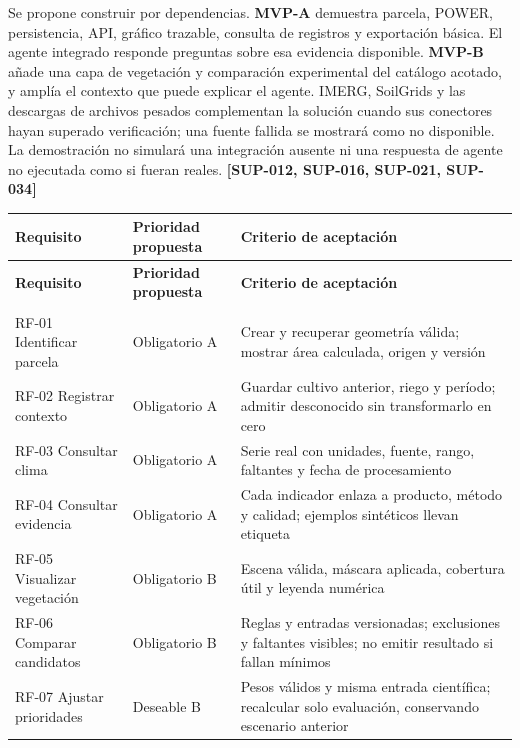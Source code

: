 \documentclass[10pt,a4paper]{article}
\begin{document}
Se propone construir por dependencias. \textbf{MVP-A} demuestra parcela, POWER, persistencia, API, gráfico trazable, consulta de registros y exportación básica. El agente integrado responde preguntas sobre esa evidencia disponible. \textbf{MVP-B} añade una capa de vegetación y comparación experimental del catálogo acotado, y amplía el contexto que puede explicar el agente. IMERG, SoilGrids y las descargas de archivos pesados complementan la solución cuando sus conectores hayan superado verificación; una fuente fallida se mostrará como no disponible. La demostración no simulará una integración ausente ni una respuesta de agente no ejecutada como si fueran reales. \textbf{[SUP-012, SUP-016, SUP-021, SUP-034]}


\begingroup\small
\begin{longtable}{>{\raggedright\arraybackslash}p{3.647cm}>{\raggedright\arraybackslash}p{5.867cm}>{\raggedright\arraybackslash}p{6.343cm}}
\toprule
\textbf{Requisito} & \textbf{Prioridad propuesta} & \textbf{Criterio de aceptación} \\
\midrule\endfirsthead
\toprule
\textbf{Requisito} & \textbf{Prioridad propuesta} & \textbf{Criterio de aceptación} \\
\midrule\endhead
\midrule\multicolumn{3}{r}{\scriptsize Continúa en la página siguiente}\\\endfoot
\bottomrule\endlastfoot
RF-01 Identificar parcela & Obligatorio A & Crear y recuperar geometría válida; mostrar área calculada, origen y versión \\[3pt]
RF-02 Registrar contexto & Obligatorio A & Guardar cultivo anterior, riego y período; admitir desconocido sin transformarlo en cero \\[3pt]
RF-03 Consultar clima & Obligatorio A & Serie real con unidades, fuente, rango, faltantes y fecha de procesamiento \\[3pt]
RF-04 Consultar evidencia & Obligatorio A & Cada indicador enlaza a producto, método y calidad; ejemplos sintéticos llevan etiqueta \\[3pt]
RF-05 Visualizar vegetación & Obligatorio B & Escena válida, máscara aplicada, cobertura útil y leyenda numérica \\[3pt]
RF-06 Comparar candidatos & Obligatorio B & Reglas y entradas versionadas; exclusiones y faltantes visibles; no emitir resultado si fallan mínimos \\[3pt]
RF-07 Ajustar prioridades & Deseable B & Pesos válidos y misma entrada científica; recalcular solo evaluación, conservando escenario anterior \\[3pt]

\end{longtable}
\end{document}

